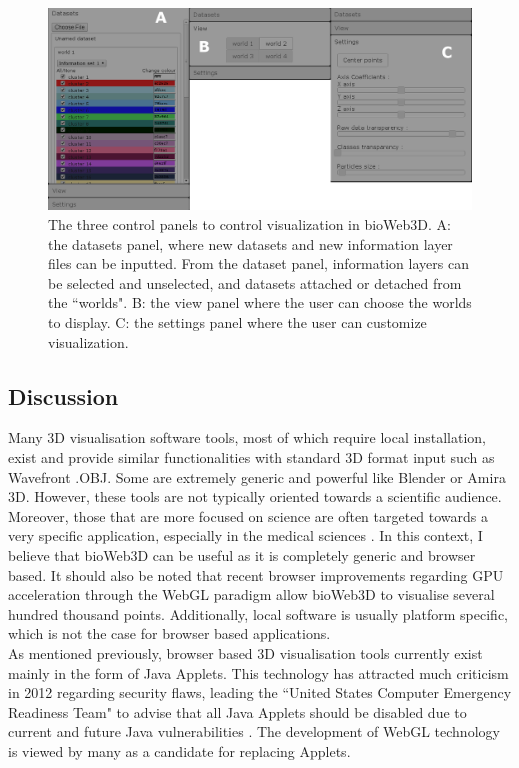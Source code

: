 	\begin{figure}[h]
\centerline{\includegraphics[width=\linewidth]{gfx/chapter3/panels.png}}
\caption{The three control panels to control visualization in bioWeb3D. A: the datasets panel, where new datasets and new information layer files can be inputted. From the dataset panel, information layers can be selected and unselected, and datasets attached or detached from the ``worlds". B: the view panel where the user can choose the worlds to display. C: the settings panel where the user can customize visualization.}\label{fig:panels}
	\end{figure}

	\subsection{Discussion}

Many 3D visualisation software tools, most of which require local installation, exist and provide similar functionalities with standard 3D format input such as Wavefront .OBJ. Some are extremely generic and powerful like Blender or Amira 3D. However, these tools are not typically oriented towards a scientific audience. Moreover, those that are more focused on science are often targeted towards a very specific application, especially in the medical sciences \cite{Wang093D}. In this context, I believe that bioWeb3D can be useful as it is completely generic and browser based. It should also be noted that recent browser improvements regarding GPU acceleration through the WebGL paradigm allow bioWeb3D to visualise several hundred thousand points. Additionally, local software is usually platform specific, which is not the case for browser based applications.\\

As mentioned previously, browser based 3D visualisation tools currently exist mainly in the form of Java Applets. This technology has attracted much criticism in 2012 regarding security flaws, leading the ``United States Computer Emergency Readiness Team" to advise that all Java Applets should be disabled due to current and future Java vulnerabilities \cite{security}. The development of WebGL technology is viewed by many as a candidate for replacing Applets. \\


